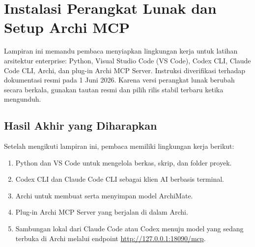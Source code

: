 \chapter{Instalasi Perangkat Lunak dan Setup Archi MCP}
\label{app:setup-archi-mcp}

\lstset{
  basicstyle=\ttfamily\scriptsize,
  breaklines=true,
  columns=fullflexible,
  frame=lines,
  showstringspaces=false
}

Lampiran ini memandu pembaca menyiapkan lingkungan kerja untuk latihan
arsitektur enterprise: Python, Visual Studio Code (VS Code), Codex CLI, Claude
Code CLI, Archi, dan plug-in Archi MCP Server. Instruksi diverifikasi terhadap
dokumentasi resmi pada 1 Juni 2026. Karena versi perangkat lunak berubah secara
berkala, gunakan tautan resmi dan pilih rilis stabil terbaru ketika mengunduh.

\section{Hasil Akhir yang Diharapkan}

Setelah mengikuti lampiran ini, pembaca memiliki lingkungan kerja berikut:

\begin{enumerate}
  \item Python dan VS Code untuk mengelola berkas, skrip, dan folder proyek.
  \item Codex CLI dan Claude Code CLI sebagai klien AI berbasis terminal.
  \item Archi untuk membuat serta menyimpan model ArchiMate.
  \item Plug-in Archi MCP Server yang berjalan di dalam Archi.
  \item Sambungan lokal dari Claude Code atau Codex menuju model yang sedang
        terbuka di Archi melalui endpoint
        \url{http://127.0.0.1:18090/mcp}.
\end{enumerate}

